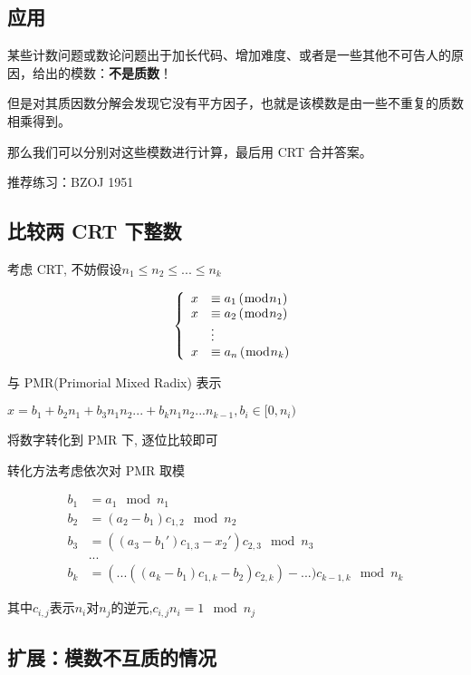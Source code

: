 \subsection{应用}

某些计数问题或数论问题出于加长代码、增加难度、或者是一些其他不可告人的原因，给出的模数：\textbf{不是质数}！

但是对其质因数分解会发现它没有平方因子，也就是该模数是由一些不重复的质数相乘得到。

那么我们可以分别对这些模数进行计算，最后用 CRT 合并答案。

推荐练习：BZOJ 1951

\subsection{比较两 CRT 下整数}

考虑 CRT, 不妨假设$n_1\leq n_2 \leq ... \leq n_k$

$$
\left\{ \begin{array} { r l } { x } & { \equiv a _ { 1 } \left( \bmod n _ { 1 } \right) } \\ { x } & { \equiv a _ { 2 } \left( \bmod n _ { 2 } \right) } \\ { } & { \vdots } \\ { x } & { \equiv a _ { n } \left( \bmod n _ { k } \right) } \end{array} \right.
$$

与 PMR(Primorial Mixed Radix) 表示

$x=b_1+b_2n_1+b_3n_1n_2...+b_kn_1n_2...n_{k-1} ,b_i\in [0,n_i)$

将数字转化到 PMR 下, 逐位比较即可

转化方法考虑依次对 PMR 取模

$$
\begin{aligned}
b_1&=a_1 \mod n_1\\
b_2&=(a_2-b_1)c_{1,2} \mod n_2\\
b_3&=((a_3-b_1')c_{1,3}-x_2')c_{2,3} \mod n_3\\
&...\\
b_k&=(...((a_k-b_1)c_{1,k}-b_2)c_{2,k})-...)c_{k-1,k} \mod n_k
\end{aligned}
$$

其中$c_{i,j}$表示$n_i$对$n_j$的逆元,$c_{i,j}n_i=1 \mod n_j$

\subsection{扩展：模数不互质的情况}

